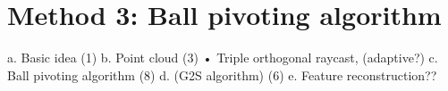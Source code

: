 
\chapter{Method 3: Ball pivoting algorithm}
\label{ch:bpa}

a.	Basic idea (1)
b.	Point cloud (3)
•	Triple orthogonal raycast, (adaptive?)
c.	Ball pivoting algorithm (8)
d.	(G2S algorithm) (6)
e.	 Feature reconstruction??
